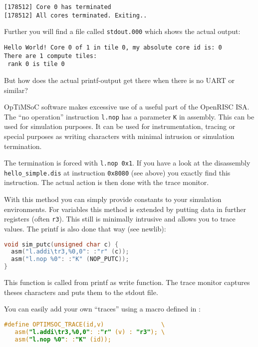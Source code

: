 \begin{lstlisting}
[178512] Core 0 has terminated
[178512] All cores terminated. Exiting..
\end{lstlisting}

Further you will find a file called \verb|stdout.000| which shows the
actual output:

\begin{lstlisting}
Hello World! Core 0 of 1 in tile 0, my absolute core id is: 0
There are 1 compute tiles:
 rank 0 is tile 0
\end{lstlisting}

But how does the actual printf-output get there when there is no UART
or similar?

OpTiMSoC software makes excessive use of a useful part of the OpenRISC ISA. The
``no operation'' instruction \verb|l.nop| has a parameter \verb|K| in assembly.
This can be used for simulation purposes. It can be used for instrumentation,
tracing or special purposes as writing characters with minimal intrusion or
simulation termination.

The termination is forced with \verb|l.nop 0x1|. If you have a look at
the disassembly \verb|hello_simple.dis| at instruction \verb|0x8080|
(see above) you exactly find this instruction. The actual action is
then done with the trace monitor.

With this method you can simply provide constants to your simulation
environments. For variables this method is extended by putting data in
further registers (often \verb|r3|). This still is minimally intrusive
and allows you to trace values. The printf is also done that way (see
newlib):

\begin{lstlisting}[language=C]
void sim_putc(unsigned char c) {
  asm("l.addi\tr3,%0,0": :"r" (c));
  asm("l.nop %0": :"K" (NOP_PUTC));
}
\end{lstlisting}

This function is called from printf as write function. The trace
monitor captures theses characters and puts them to the stdout file.

You can easily add your own ``traces'' using a macro defined in
:

\begin{lstlisting}[language=C]
#define OPTIMSOC_TRACE(id,v)                \
   asm("l.addi\tr3,%0,0": :"r" (v) : "r3"); \
   asm("l.nop %0": :"K" (id));
\end{lstlisting}

